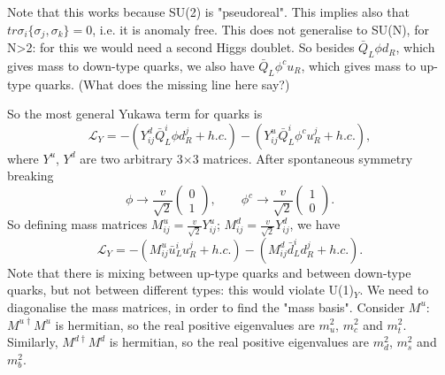 Note that this works because SU(2) is "pseudoreal". This implies also that $tr \sigma_i \{\sigma_j, \sigma_k \} = 0$, i.e. it is anomaly free. This does not generalise to SU(N), for N>2: for this we would need a second Higgs doublet. So besides $\bar{Q}_L\phi d_R$, which gives mass to down-type quarks, we also have $\bar{Q}_L\phi^c u_R$, which gives mass to up-type quarks. (What does the missing line here say?)

So the most general Yukawa term for quarks is
\begin{equation}
\mathcal{L}_{Y} = -(Y_{ij}^d \bar{Q}_L^i \phi d_R^j + h.c.) - (Y_{ij}^u \bar{Q}_L^i \phi^c u_R^j + h.c.),
\end{equation}
where $Y^u$, $Y^d$ are two arbitrary 3$\times$3 matrices. After spontaneous symmetry breaking
\begin{equation}
\phi \to \frac{v}{\sqrt{2}}\begin{pmatrix} 0 \\ 1 \end{pmatrix},
\qquad \phi^c \to \frac{v}{\sqrt{2}}\begin{pmatrix} 1 \\ 0 \end{pmatrix}.
\end{equation}
So defining mass matrices $M_{ij}^u = \frac{v}{\sqrt{2}}Y_{ij}^u$; $M_{ij}^d = \frac{v}{\sqrt{2}}Y_{ij}^d$, we have
\begin{equation}
\mathcal{L}_{Y} = -(M_{ij}^u \bar{u}_L^i u_R^j + h.c.) - (M_{ij}^d \bar{d}_L^i d_R^j + h.c.).
\end{equation}
Note that there is mixing between up-type quarks and between down-type quarks, but not between different types: this would violate U(1)$_Y$. We need to diagonalise the mass matrices, in order to find the "mass basis". Consider $M^u$: $M^{u \dagger} M^u$ is hermitian, so the real positive eigenvalues are $m_u^2$, $m_c^2$ and $m_t^2$. Similarly, $M^{d \dagger} M^d$ is hermitian, so the real positive eigenvalues are $m_d^2$, $m_s^2$ and $m_b^2$.
